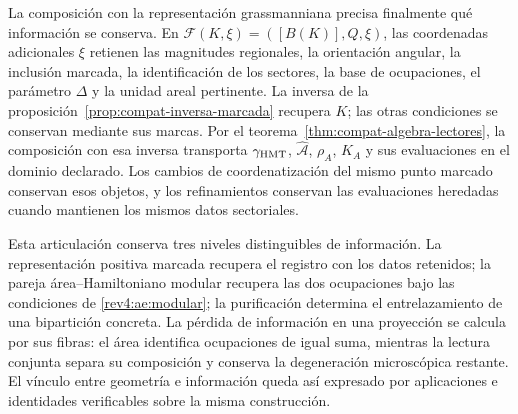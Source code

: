 La composición con la representación grassmanniana precisa finalmente
qué información se conserva. En
\(\mathcal F(K,\xi)=([B(K)],Q,\xi)\), las coordenadas adicionales
\(\xi\) retienen las magnitudes regionales, la orientación angular,
la inclusión marcada, la identificación de los sectores, la base de
ocupaciones, el parámetro \(\Delta\) y la unidad areal pertinente.
La inversa de la proposición~\ref{prop:compat-inversa-marcada}
recupera \(K\); las otras condiciones se conservan mediante sus
marcas. Por el teorema~\ref{thm:compat-algebra-lectores}, la composición
con esa inversa transporta \(\gamma_{\rm HMT}\),
\(\widehat{\mathcal A}\), \(\rho_A\), \(K_A\) y sus evaluaciones
en el dominio declarado. Los cambios de coordenatización del mismo punto marcado
conservan esos objetos, y los refinamientos conservan las evaluaciones
heredadas cuando mantienen los mismos datos sectoriales.

Esta articulación conserva tres niveles distinguibles de información.
La representación positiva marcada recupera el registro con los datos
retenidos; la pareja área--Hamiltoniano modular recupera las dos
ocupaciones bajo las condiciones de \eqref{rev4:ae:modular}; la
purificación determina el entrelazamiento de una bipartición concreta.
La pérdida de información en una proyección se calcula por sus fibras:
el área identifica ocupaciones de igual suma, mientras la lectura
conjunta separa su composición y conserva la degeneración microscópica
restante. El vínculo entre geometría e información queda así expresado
por aplicaciones e identidades verificables sobre la misma construcción.

